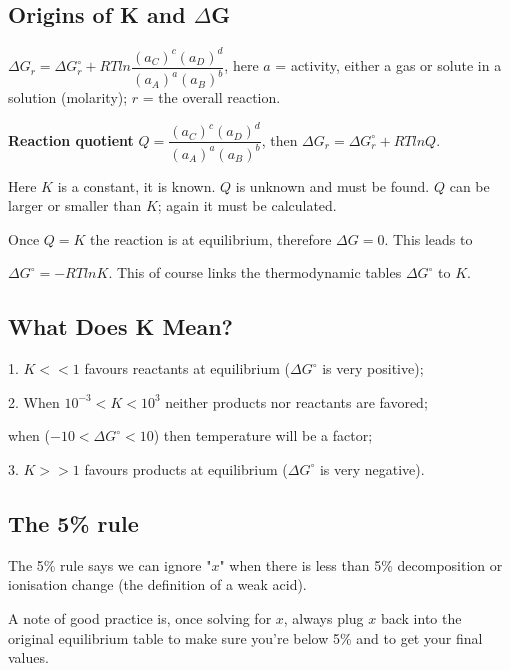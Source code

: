 \documentclass[a4paper,12pt]{article}
\begin{document}
\subsection{Origins of K and $\Delta$G}
$\Delta G_{r} = \Delta G^{\circ}_{r} + RT ln\dfrac{(a_{C})^{c}(a_{D})^{d}}{(a_{A})^{a}(a_{B})^{b}}$, here $a$ = activity, either a gas or solute in a solution (molarity); $r$ = the overall reaction.\par
\textbf{Reaction quotient} $Q =\dfrac{(a_{C})^{c}(a_{D})^{d}}{(a_{A})^{a}(a_{B})^{b}}$, then $\Delta G_{r} = \Delta G^{\circ}_{r} + RT lnQ$.\par
 Here $K$ is a constant, it is known. $Q$ is unknown and must be found. $Q$ can be larger or smaller than $K$; again it must be calculated.\par
Once $Q = K$ the reaction is at equilibrium, therefore $\Delta G=0$. This leads to\par
$\Delta G^{\circ}=-RTlnK$. This of course links the thermodynamic tables $\Delta G^{\circ}$ to $K$.\par
\subsection{What Does K Mean?}
1. $K << 1$ favours reactants at equilibrium ($\Delta G^{\circ}$ is very positive);\par
2. When $10^{-3} < K < 10^{3}$ neither products nor reactants are favored;\par when ($-10<\Delta G^{\circ}<10$) then temperature will be a factor;\par
3. $K >> 1$ favours products at equilibrium ($\Delta G^{\circ}$ is very negative).
\subsection{The 5\% rule}
The 5\% rule says we can ignore "$x$" when there is less than 5\% decomposition or ionisation change (the definition of a weak acid).\par
A note of good practice is, once solving for $x$, always plug $x$ back into the original equilibrium table to make sure you’re below 5\% and to get your final values.
\end{document}
